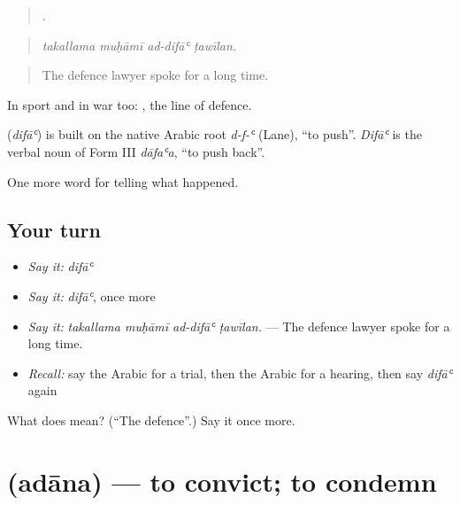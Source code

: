 \begin{quote}
   .
\end{quote}

\begin{quote}
\emph{takallama muḥāmī ad-difāʿ ṭawīlan.}
\end{quote}

\begin{quote}
The defence lawyer spoke for a long time.
\end{quote}

In sport and in war too:  , the line of defence.

\begin{cousinweb}
\textbf{} (\emph{difāʿ}) is built on the native Arabic root \emph{d-f-ʿ} (Lane), \textquotedblleft{}to push\textquotedblright{}. \emph{Difāʿ} is the verbal noun of Form III \emph{dāfaʿa}, \textquotedblleft{}to push back\textquotedblright{}.
\end{cousinweb}

\begin{grammarlens}[title={What you've built}]
One more word for telling what happened.
\end{grammarlens}

\subsection*{Your turn}
\begin{itemize}
\raggedright
  \item \emph{Say it:} \emph{difāʿ}
  \item \emph{Say it:} \emph{difāʿ}, once more
  \item \emph{Say it:} \emph{takallama muḥāmī ad-difāʿ ṭawīlan.} — The defence lawyer spoke for a long time.
  \item \emph{Recall:} say the Arabic for a trial, then the Arabic for a hearing, then say \emph{difāʿ} again
\end{itemize}

\begin{tcolorbox}[breakable,colback=teal!4,colframe=teal!35!black,title={Before you move on}]
What does  mean? (\textquotedblleft{}The defence\textquotedblright{}.) Say it once more.
\end{tcolorbox}
\section[\texorpdfstring{\ar{أدان} (adāna)}{أدان (adāna)}]{ (adāna) — to convict; to condemn}

